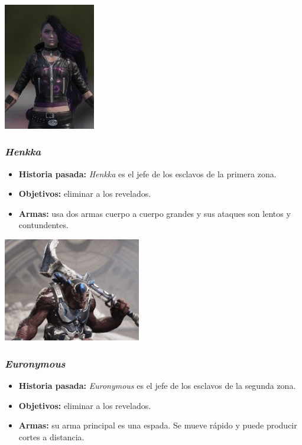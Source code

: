 \documentclass[11pt, twoside]{article}
\begin{document}
\begin{center}
\includegraphics[width=4cm]{./images/spectre.jpg}
\end{center}

\subsubsection{\textit{Henkka}}
\begin{itemize}
\item \textbf{Historia pasada:} \textit{Henkka} es el jefe de los esclavos de la primera zona.
\item \textbf{Objetivos:} eliminar a los revelados.
\item \textbf{Armas:} usa dos armas cuerpo a cuerpo grandes y sus ataques son lentos y contundentes. 
\end{itemize}

\begin{center}
\includegraphics[width=6cm]{./images/henkka.jpg}
\end{center}

\subsubsection{\textit{Euronymous}}
\begin{itemize}
\item \textbf{Historia pasada:} \textit{Euronymous} es el jefe de los esclavos de la segunda zona.
\item \textbf{Objetivos:} eliminar a los revelados.
\item \textbf{Armas:} su arma principal es una espada. Se mueve rápido y puede producir cortes a distancia. 
\end{itemize}
\end{document}

